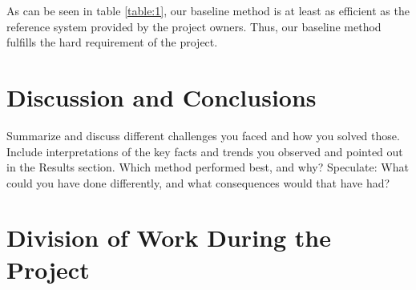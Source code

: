 \documentclass[sigconf]{acmart}
\begin{document}
As can be seen in table \ref{table:1}, our baseline method is at least as efficient as the reference system provided by the project owners. Thus, our baseline method fulfills the hard requirement of the project.

\section{Discussion and Conclusions}

Summarize and discuss different challenges you faced and how you solved those. Include interpretations of the key facts and trends you observed and pointed out in the Results section. Which method performed best, and why? Speculate: What could you have done differently, and what consequences would that have had?







\newpage
\appendix
\section{Division of Work During the Project}
\end{document}
